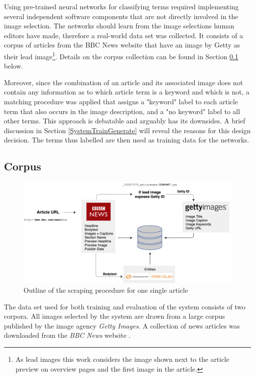 \documentclass[11pt,a4paper,twoside]{article}
\begin{document}
\bigskip

Using pre-trained neural networks for classifying terms required implementing several independent software components that are not directly involved in the image selection. The networks should learn from the image selections human editors have made, therefore a real-world data set was collected. It consists of a corpus of articles from the BBC News website \cite{BBCBBCNews} that have an image by Getty as their lead image\footnote{As lead images this work considers the image shown next to the article preview on overview pages and the first image in the article.}. Details on the corpus collection can be found in Section \ref{SystemCorpus} below.

Moreover, since the combination of an article and its associated image does not contain any information as to which article term is a keyword and which is not, a matching procedure was applied that assigns a "keyword" label to each article term that also occurs in the image description, and a "no keyword" label to all other terms. This approach is debatable and arguably has its downsides. A brief discussion in Section \ref{SystemTrainGenerate} will reveal the reasons for this design decision. The terms thus labelled are then used as training data for the networks.

\subsection{Corpus} \label{SystemCorpus}

\begin{figure}[t]
  \includegraphics[width=\columnwidth]{picpic-scraper.png}
  \caption{Outline of the scraping procedure for one single article}
  \label{fig:picpic-scraper}
\end{figure}

The data set used for both training and evaluation of the system consists of two corpora. All images selected by the system are drawn from a large corpus published by the image agency \emph{Getty Images}. A collection of news articles was downloaded from the \emph{BBC News} website \cite{BBCBBCNews}.
\end{document}
